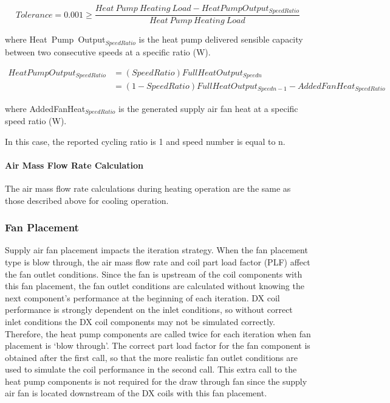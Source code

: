 \begin{equation}
Tolerance = 0.001 \ge \frac{{Heat~Pump~Heating~Load - HeatPumpOutpu{t_{SpeedRatio}}}}{{Heat~Pump~Heating~Load}}
\end{equation}

where Heat~Pump~Output\(_{SpeedRatio}\) is the heat pump delivered sensible capacity between two consecutive speeds at a specific ratio (W).

\begin{equation}
\begin{array}{rl}
HeatPumpOutpu{t_{SpeedRatio}} &= (SpeedRatio)FullHeatOutpu{t_{Speedn}} \\
 &= (1 - SpeedRatio)FullHeatOutpu{t_{Speedn-1}} - AddedFanHea{t_{SpeedRatio}}
 \end{array}
\end{equation}

where AddedFanHeat\(_{SpeedRatio}\) is the generated supply air fan heat at a specific speed ratio (W).

In this case, the reported cycling ratio is 1 and speed number is equal to n.

\paragraph{Air Mass Flow Rate Calculation}\label{air-mass-flow-rate-calculation-3}

The air mass flow rate calculations during heating operation are the same as those described above for cooling operation.

\subsubsection{Fan Placement}\label{fan-placement}

Supply air fan placement impacts the iteration strategy. When the fan placement type is blow through, the air mass flow rate and coil part load factor (PLF) affect the fan outlet conditions. Since the fan is upstream of the coil components with this fan placement, the fan outlet conditions are calculated without knowing the next component's performance at the beginning of each iteration. DX coil performance is strongly dependent on the inlet conditions, so without correct inlet conditions the DX coil components may not be simulated correctly. Therefore, the heat pump components are called twice for each iteration when fan placement is `blow through'. The correct part load factor for the fan component is obtained after the first call, so that the more realistic fan outlet conditions are used to simulate the coil performance in the second call. This extra call to the heat pump components is not required for the draw through fan since the supply air fan is located downstream of the DX coils with this fan placement.

